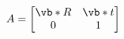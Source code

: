 \begin{equation}\label{eq:homogenous_matrix}
A=
  \begin{bmatrix}
  \vb*{R} & \vb*{t} \\
   0      &  1  
  \end{bmatrix}
\end{equation}


